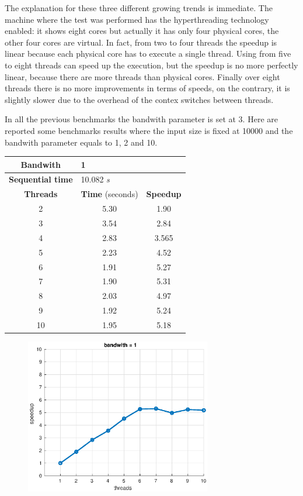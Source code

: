 \documentclass[10pt,twocolumn,letterpaper]{article}
\begin{document}
The explanation for these three different growing trends is immediate. The machine where the test was performed has the hyperthreading technology enabled: it shows eight cores but actually it has only four physical cores, the other four cores are virtual. In fact, from two to four threads the speedup is linear because each physical core has to execute a single thread. Using from five to eight threads can speed up the execution, but the speedup is no more perfectly linear, because there are more threads than physical cores. Finally over eight threads there is no more improvements in terms of speeds, on the contrary, it is slightly slower due to the overhead of the contex switches between threads.

In all the previous benchmarks the bandwith parameter is set at 3. Here are reported some benchmarks results where the input size is fixed at 10000 and the bandwith parameter equals to 1, 2 and 10.

\begin{table}[H]
\centering
\begin{tabular}{ccc}
\hline
\textbf{Bandwith} & \multicolumn{2}{l}{1} \\ 
\hline
\textbf{Sequential time} & \multicolumn{2}{l}{10.082 \textit{s}} \\
\hline
\textbf{Threads} & \textbf{Time} (seconds) & \textbf{Speedup} \\
\hline
2 & 5.30  & 1.90 \\
3 & 3.54 & 2.84 \\
4 & 2.83 & 3.565 \\
5 & 2.23 & 4.52 \\
6 & 1.91 & 5.27 \\
7 & 1.90 & 5.31 \\
8 & 2.03 & 4.97 \\
9 & 1.92 & 5.24 \\
10 & 1.95 & 5.18 \\
\hline
\end{tabular}
\end{table}

\begin{figure}[H]
\centering
\includegraphics[width=3.2in]{fig/speedup1b.eps}
\end{figure}
\end{document}
